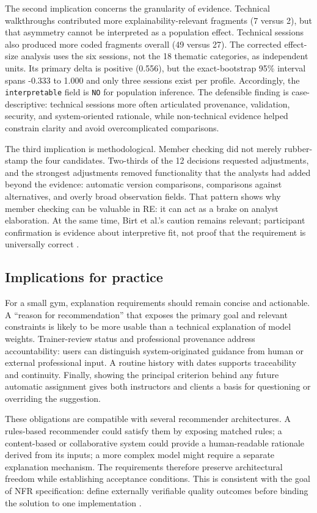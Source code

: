 \documentclass[pdflatex,sn-basic]{sn-jnl}
\begin{document}
The second implication concerns the granularity of evidence. Technical walkthroughs contributed more explainability-relevant fragments (7 versus 2), but that asymmetry cannot be interpreted as a population effect. Technical sessions also produced more coded fragments overall (49 versus 27). The corrected effect-size analysis uses the six sessions, not the 18 thematic categories, as independent units. Its primary delta is positive (0.556), but the exact-bootstrap 95\% interval spans -0.333 to 1.000 and only three sessions exist per profile. Accordingly, the \texttt{interpretable} field is \texttt{NO} for population inference. The defensible finding is case-descriptive: technical sessions more often articulated provenance, validation, security, and system-oriented rationale, while non-technical evidence helped constrain clarity and avoid overcomplicated comparisons.

The third implication is methodological. Member checking did not merely rubber-stamp the four candidates. Two-thirds of the 12 decisions requested adjustments, and the strongest adjustments removed functionality that the analysts had added beyond the evidence: automatic version comparisons, comparisons against alternatives, and overly broad observation fields. That pattern shows why member checking can be valuable in RE: it can act as a brake on analyst elaboration. At the same time, Birt et al.'s caution remains relevant; participant confirmation is evidence about interpretive fit, not proof that the requirement is universally correct \cite{birt2016}.

\subsection{Implications for practice}
For a small gym, explanation requirements should remain concise and actionable. A ``reason for recommendation'' that exposes the primary goal and relevant constraints is likely to be more usable than a technical explanation of model weights. Trainer-review status and professional provenance address accountability: users can distinguish system-originated guidance from human or external professional input. A routine history with dates supports traceability and continuity. Finally, showing the principal criterion behind any future automatic assignment gives both instructors and clients a basis for questioning or overriding the suggestion.

These obligations are compatible with several recommender architectures. A rules-based recommender could satisfy them by exposing matched rules; a content-based or collaborative system could provide a human-readable rationale derived from its inputs; a more complex model might require a separate explanation mechanism. The requirements therefore preserve architectural freedom while establishing acceptance conditions. This is consistent with the goal of NFR specification: define externally verifiable quality outcomes before binding the solution to one implementation \cite{glinz2007,iso25010}.
\end{document}
